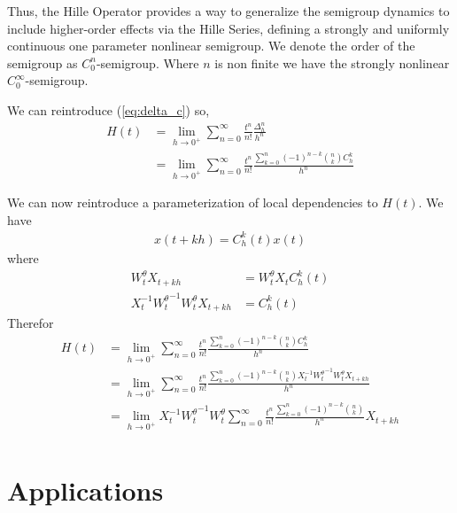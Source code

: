 \documentclass{article}
\begin{document}
Thus, the Hille Operator provides a way to generalize the semigroup dynamics to include higher-order effects via the Hille Series, defining a strongly and uniformly continuous one parameter nonlinear semigroup. We denote the order of the semigroup as $C_0^n$-semigroup. Where $n$ is non finite we have the strongly nonlinear $C_0^\infty$-semigroup. 

We can reintroduce (\ref{eq:delta_c}) so,
\begin{align*}
    H(t)  &= \lim_{h\rightarrow0^+} \sum_{n=0}^\infty \frac{t^n}{n!} \frac{\Delta_h^n}{h^n} \\
    &= \lim_{h\rightarrow0^+} \sum_{n=0}^\infty \frac{t^n}{n!} \frac{ \sum_{k=0}^n (-1)^{n-k} {n \choose k} C_h^k}{h^n} 
\end{align*}

We can now reintroduce a parameterization of local dependencies to $H(t)$. We have
\begin{align*}
    x(t+kh) = C_h^k(t) x(t)
\end{align*}
where
\begin{align*}
    W_t^\theta X_{t+kh} &= W_t^\theta X_{t} C_h^k(t)\\
    X_{t}^{-1}  {W_t^\theta}^{-1} {W_t^\theta} X_{t+kh} &=  C_h^k(t)
\end{align*}
Therefor
\begin{align*}
    H(t)  &= \lim_{h\rightarrow0^+} \sum_{n=0}^\infty \frac{t^n}{n!} \frac{ \sum_{k=0}^n (-1)^{n-k} {n \choose k} C_h^k}{h^n}\\ 
    &= \lim_{h\rightarrow0^+} \sum_{n=0}^\infty \frac{t^n}{n!} \frac{\sum_{k=0}^n (-1)^{n-k} {n \choose k}   X_{t}^{-1}  {W_t^\theta}^{-1} {W_t^\theta} X_{t+kh}}{h^n}\\
    &= \lim_{h\rightarrow0^+} X_{t}^{-1}  {W_t^\theta}^{-1} {W_t^\theta} \sum_{n=0}^\infty \frac{t^n}{n!} \frac{\sum_{k=0}^n (-1)^{n-k} {n \choose k}}{h^n} X_{t+kh}\\
\end{align*}

\section{Applications}
\end{document}
